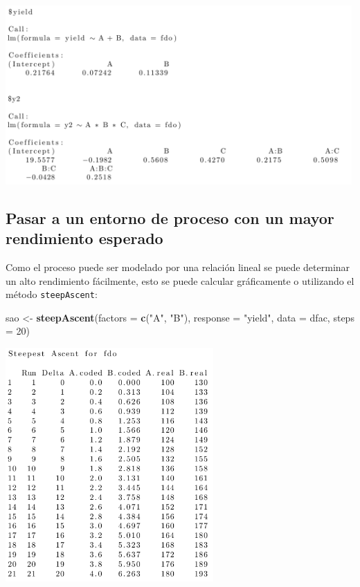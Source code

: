 \documentclass[
]{book}
\newenvironment{Shaded}{\begin{snugshade}}{\end{snugshade}}
\newcommand{\AttributeTok}[1]{\textcolor[rgb]{0.13,0.29,0.53}{#1}}
\newcommand{\DecValTok}[1]{\textcolor[rgb]{0.00,0.00,0.81}{#1}}
\newcommand{\FunctionTok}[1]{\textcolor[rgb]{0.13,0.29,0.53}{\textbf{#1}}}
\newcommand{\NormalTok}[1]{#1}
\newcommand{\OtherTok}[1]{\textcolor[rgb]{0.56,0.35,0.01}{#1}}
\newcommand{\StringTok}[1]{\textcolor[rgb]{0.31,0.60,0.02}{#1}}
\begin{document}
\includegraphics[width=5.20833in,height=\textheight]{graficos/multidfaclm.png}

\hypertarget{pasar-a-un-entorno-de-proceso-con-un-mayor-rendimiento-esperado}{%
\subsection{Pasar a un entorno de proceso con un mayor rendimiento esperado}\label{pasar-a-un-entorno-de-proceso-con-un-mayor-rendimiento-esperado}}

Como el proceso puede ser modelado por una relación lineal se puede determinar un alto rendimiento fácilmente, esto se puede calcular gráficamente o utilizando el método \texttt{steepAscent}:

\begin{Shaded}
\begin{Highlighting}[]
\NormalTok{sao }\OtherTok{\textless{}{-}} \FunctionTok{steepAscent}\NormalTok{(}\AttributeTok{factors =} \FunctionTok{c}\NormalTok{(}\StringTok{"A"}\NormalTok{, }\StringTok{"B"}\NormalTok{), }\AttributeTok{response =} \StringTok{"yield"}\NormalTok{, }\AttributeTok{data =}\NormalTok{ dfac, }\AttributeTok{steps =} \DecValTok{20}\NormalTok{)}
\end{Highlighting}
\end{Shaded}

\includegraphics[width=3.125in,height=\textheight]{graficos/renddfac1.png}
\end{document}

